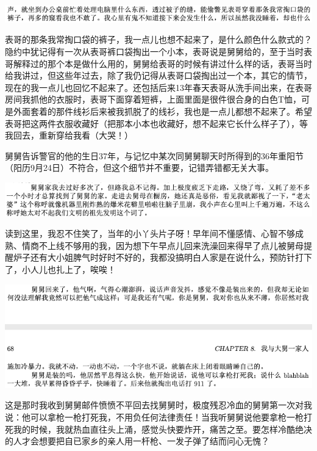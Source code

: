 \documentclass[9pt, b5paper]{article}
\begin{document}
\begin{center}
\includegraphics[width=.9\linewidth]{./pic/p1p67-10.png}
\end{center}

表哥的那条我常掏口袋的裤子，我一点儿也想不起来了，是什么颜色什么款式的？隐约中犹记得有一次从表哥裤口袋掏出一个小本，表哥说是舅舅给的，至于当时表哥解释过的那个本是做什么用的，舅舅给表哥的时候有讲过什么样的话，表哥当时给我讲过，但这些年过去，除了我仍记得从表哥口袋掏出过一个本，其它的情节，现在的我一点儿也回忆不起来了。还包括后来13年春天表哥从洗手间出来，在表哥房间我抓他的衣服时，表哥下面穿着短裤，上面里面是很件很合身的白色T恤，可是外面套着的那件线衫后来被我抓脱了的线衫，我也是一点儿都想不起来了。希望表哥把这两件衣服收藏好（把那本小本也收藏好，想不起来它长什么样子了），等我回去，重新穿给我看（大哭！）

舅舅告诉警官的他的生日37年，与记忆中某次同舅舅聊天时所得到的36年重阳节（阳历9月24日）不符合，但这个细节并不重要，记错弄错都无关大事。

\begin{center}
\includegraphics[width=.9\linewidth]{./pic/p1p67-9.png}
\end{center}

读到这里，我忍不住笑了，当年的小丫头片子呀！早年间不懂感情、心智不够成熟、情商不上线不够用的我，因为想下午早点儿回来洗澡回来得早了点儿被舅母提醒炉子还有大小姐脾气时好时不好的，我都没搞明白人家是在说什么，预防针打下了，小人儿也扎上了，唉唉！

\begin{center}
\includegraphics[width=.9\linewidth]{./pic/p1p68-3.png}
\end{center}

这是那时我收到舅舅邮件愤愤不平回去找舅舅时，极度残忍冷血的舅舅第一次对我说：他可以拿枪一枪打死我，不用负任何法律责任！当我听舅舅说他要拿枪一枪打死我的时候，我就热血直往头上涌，感觉头快要炸开，痛苦之至。要怎样冷酷绝决的人才会想要把自已家乡的亲人用一杆枪、一发子弹了结而问心无愧？
\end{document}
